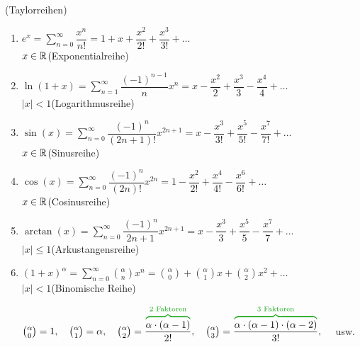\Bsp (Taylorreihen)
\begin{enumerate}
	\item\label{refe} $e^x=\sum\limits_{n=0}^{\infty}\dfrac{x^n}{n!}=1+x+\dfrac{x^2}{2!}+\dfrac{x^3}{3!}+\ldots$\\
	\hhfill$x\in\mathbb{R}$\quad(Exponentialreihe)
	
	\item\label{refln} $\ln(1+x)=\sum\limits_{n=1}^{\infty}\dfrac{(-1)^{n-1}}{n}x^n=x-\dfrac{x^2}{2}+\dfrac{x^3}{3}-\dfrac{x^4}{4}+\ldots$\\
	\hhfill$|x|<1$\quad(Logarithmusreihe)\\
	
	\item\label{refsin} $\sin(x)=\sum\limits_{n=0}^{\infty}\dfrac{(-1)^n}{(2n+1)!}x^{2n+1}=x-\dfrac{x^3}{3!}+\dfrac{x^5}{5!}-\dfrac{x^7}{7!}+\ldots$\\
	\hhfill$x\in\mathbb{R}$\quad(Sinusreihe)
	
	\item\label{refcos} $\cos(x)=\sum\limits_{n=0}^{\infty}\dfrac{(-1)^n}{(2n)!}x^{2n}=1-\dfrac{x^2}{2!}+\dfrac{x^4}{4!}-\dfrac{x^6}{6!}+\ldots$\\
	\hhfill$x\in\mathbb{R}$\quad(Cosinusreihe)
	
	\item\label{refarctan} $\arctan(x)=\sum\limits_{n=0}^{\infty}\dfrac{(-1)^n}{2n+1}x^{2n+1}=x-\dfrac{x^3}{3}+\dfrac{x^5}{5}-\dfrac{x^7}{7}+\ldots$\\
	\hhfill$|x|\le1$\quad(Arkustangensreihe)
	
	\item\label{refbinom} $(1+x)^\alpha=\sum\limits_{n=0}^{\infty}\binom{\alpha}{n}x^n=\binom{\alpha}{0}+\binom{\alpha}{1}x+\binom{\alpha}{2}x^2+\ldots$\\
	\hhfill$|x|<1$\quad(Binomische Reihe)
	
	
	\Bsp $\binom{\alpha}{0}=1,\quad\binom{\alpha}{1}=\alpha,\quad\binom{\alpha}{2}=\dfrac{\greenoverbrace{\alpha\cdot(\alpha-1)}{\text{2 Faktoren}}}{2!},\quad\binom{\alpha}{3}=\dfrac{\greenoverbrace{\alpha\cdot(\alpha-1)\cdot(\alpha-2)}{\text{3 Faktoren}}}{3!},\quad$ usw.
	

\end{enumerate}
